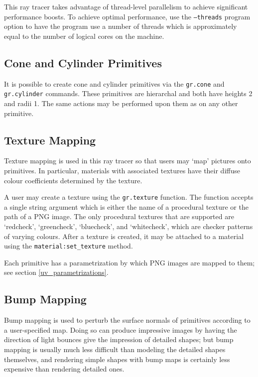 \documentclass{article}
\begin{document}
This ray tracer takes advantage of thread-level parallelism to achieve
significant performance boosts. To achieve optimal performance, use the
{\tt --threads} program option to have the program use a number of threads which is
approximately equal to the number of logical cores on the machine.

\subsection{Cone and Cylinder Primitives}
\label{primitives}

It is possible to create cone and cylinder primitives via the {\tt gr.cone} and
{\tt gr.cylinder} commands. These primitives are hierarchal and both have heights
2 and radii 1. The same actions may be performed
upon them as on any other primitive.

\subsection{Texture Mapping}
\label{texture_mapping}

Texture mapping is used in this ray tracer so that users may `map' pictures onto
primitives. In particular, materials with associated textures have their diffuse
colour coefficients determined by the texture.

A user may create a texture using the {\tt gr.texture} function. The function
accepts a single string argument which is either the name of a procedural
texture or the path of a PNG image. The only procedural textures that are
supported are `redcheck', `greencheck', `bluecheck', and `whitecheck', which are
checker patterns of varying colours. After a texture is created, it may be
attached to a material using the {\tt material:set\_texture} method.

Each primitive has a parametrization by which PNG images are mapped to them; see
section \ref{uv_parametrizations}.


\subsection{Bump Mapping}
\label{bump_mapping}

Bump mapping is used to perturb the surface normals of primitives according to a
user-specified map. Doing so can produce impressive images by having the
direction of light bounces give the impression of detailed shapes; but bump
mapping is usually much less difficult than modeling the detailed shapes
themselves, and rendering simple shapes with bump maps is certainly less
expensive than rendering detailed ones.
\end{document}
